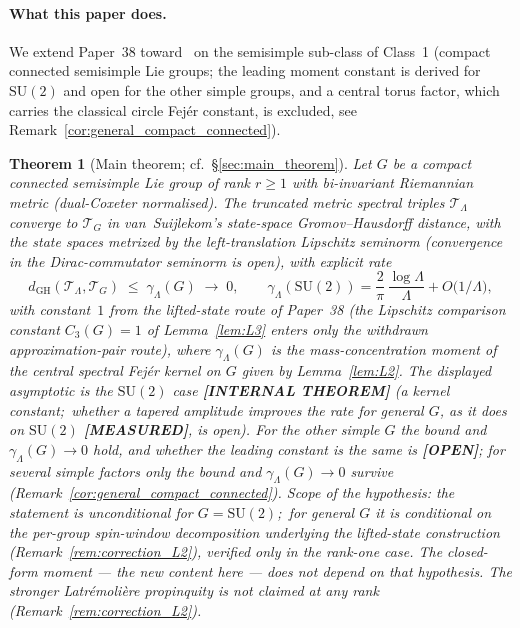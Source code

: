 \documentclass[11pt,a4paper]{article}
\theoremstyle{plain}
\newtheorem{theorem}{Theorem}[section]
\theoremstyle{definition}
\newcommand{\Lammax}{\Lambda}
\newcommand{\Tcal}{\mathcal{T}}
\newcommand{\SU}{\mathrm{SU}}
\begin{document}
\paragraph{What this paper does.}
We extend Paper~38 toward~\cite{gaudillot_estrada_vs2025} on
the semisimple sub-class of Class~1 (compact connected semisimple Lie
groups; the leading moment constant is derived for $\SU(2)$ and open for
the other simple groups, and a central torus factor, which carries the
classical circle Fej\'er constant, is excluded, see
Remark~\ref{cor:general_compact_connected}).

\begin{theorem}[Main theorem; cf.~\S\ref{sec:main_theorem}]
\label{thm:main_intro}
Let $G$ be a compact connected semisimple Lie group of rank $r \ge 1$
with bi-invariant Riemannian metric (dual-Coxeter normalised). The
truncated metric spectral triples $\Tcal_\Lammax$ converge to $\Tcal_G$
in van~Suijlekom's state-space Gromov--Hausdorff distance, with the
state spaces metrized by the left-translation Lipschitz seminorm
(convergence in the Dirac-commutator seminorm is open), with
explicit rate
\begin{equation}\label{eq:main_intro}
   d_{\mathrm{GH}}(\Tcal_\Lammax, \Tcal_G)
   \;\le\; \gamma_\Lammax(G) \;\to\; 0, \qquad
   \gamma_\Lammax(\SU(2)) = \frac{2}{\pi}\,\frac{\log \Lammax}{\Lammax}
   + O\!\bigl(1/\Lammax\bigr),
\end{equation}
with constant~$1$ from the lifted-state route of Paper~38 (the
Lipschitz comparison constant $C_3(G) = 1$ of Lemma~\ref{lem:L3} enters
only the withdrawn approximation-pair route), where
$\gamma_\Lammax(G)$ is the mass-concentration moment of the central
spectral Fej\'er kernel on $G$ given by Lemma~\ref{lem:L2}. The
displayed asymptotic is the $\SU(2)$ case \textbf{[INTERNAL THEOREM]} (a
kernel constant;\ whether a tapered amplitude improves the rate for
general $G$, as it does on $\SU(2)$ \textbf{[MEASURED]}, is open). For
the other simple $G$ the bound and $\gamma_\Lammax(G) \to 0$ hold, and
whether the leading constant is the same is \textbf{[OPEN]}; for several
simple factors only the bound and $\gamma_\Lammax(G) \to 0$ survive
(Remark~\ref{cor:general_compact_connected}).
\emph{Scope of the hypothesis:} the statement is unconditional for
$G = \SU(2)$;\ for general $G$ it is conditional on the per-group
spin-window decomposition underlying the lifted-state construction
(Remark~\ref{rem:correction_L2}), verified only in the rank-one case.
The
closed-form moment --- the new content here --- does not depend on that
hypothesis. The stronger
Latr\'emoli\`ere propinquity is not claimed at any rank
(Remark~\ref{rem:correction_L2}).
\end{theorem}
\end{document}

